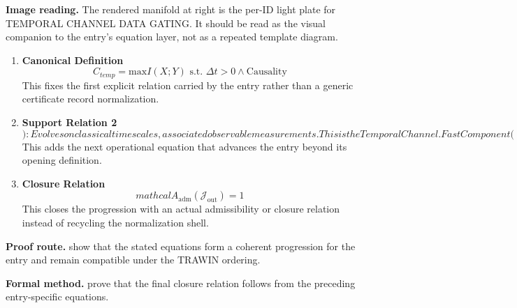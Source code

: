 \begin{samepage}
\noindent\begin{minipage}[t]{0.45\linewidth}
\vspace{0pt}
\raggedright
\scriptsize\textbf{Image reading.} The rendered manifold at right is the per-ID light plate for TEMPORAL CHANNEL DATA GATING. It should be read as the visual companion to the entry's equation layer, not as a repeated template diagram.\par
\end{minipage}\hfill
\begin{minipage}[t]{0.53\linewidth}
\vspace*{-0.10in}
\raggedright
{}
\end{minipage}
\end{samepage}

\clearpage


\begin{enumerate}[leftmargin=1.6em,itemsep=9pt,topsep=6pt]
\item \textbf{Canonical Definition}
\[
C_{temp} = \mathrm{max} I(X;Y) \text{ s.t. } \Delta t > 0 \land \text{Causality}
\]
This fixes the first explicit relation carried by the entry rather than a generic certificate record normalization.

\item \textbf{Support Relation 2}
\[
): Evolves on classical timescales, associated observable measurements. This is the Temporal Channel. Fast Component (
\]
This adds the next operational equation that advances the entry beyond its opening definition.

\item \textbf{Closure Relation}
\[
mathcal{A}_{\mathrm{adm}}\!\left(\mathcal{J}_{\mathrm{out}}\right)=1
\]
This closes the progression with an actual admissibility or closure relation instead of recycling the normalization shell.
\end{enumerate}

\textbf{Proof route.} show that the stated equations form a coherent progression for the entry and remain compatible under the TRAWIN ordering.

\textbf{Formal method.} prove that the final closure relation follows from the preceding entry-specific equations.

\medskip
{}

